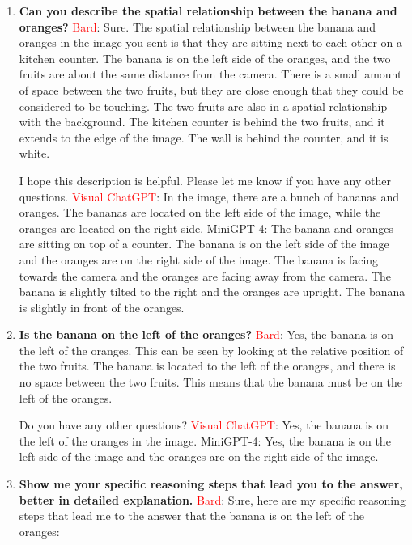     \begin{enumerate}
        \item \textbf{Can you describe the spatial relationship between the banana and oranges?}
        \subitem 
        \textcolor{Red}{Bard}: Sure. The spatial relationship between the banana and oranges in the image you sent is that they are sitting next to each other on a kitchen counter. The banana is on the left side of the oranges, and the two fruits are about the same distance from the camera. There is a small amount of space between the two fruits, but they are close enough that they could be considered to be touching.
        The two fruits are also in a spatial relationship with the background. The kitchen counter is behind the two fruits, and it extends to the edge of the image. The wall is behind the counter, and it is white.

        I hope this description is helpful. Please let me know if you have any other questions.
        \subitem \textcolor{red}{Visual ChatGPT}: In the image, there are a bunch of bananas and oranges. The bananas are located on the left side of the image, while the oranges are located on the right side.
        \subitem MiniGPT-4: The banana and oranges are sitting on top of a counter. The banana is on the left side of the image and the oranges are on the right side of the image. The banana is facing towards the camera and the oranges are facing away from the camera. The banana is slightly tilted to the right and the oranges are upright. The banana is slightly in front of the oranges.
        \item \textbf{Is the banana on the left of the oranges?}
        \subitem \textcolor{Red}{Bard}:
        Yes, the banana is on the left of the oranges. This can be seen by looking at the relative position of the two fruits. The banana is located to the left of the oranges, and there is no space between the two fruits. This means that the banana must be on the left of the oranges.
        
        Do you have any other questions?
        \subitem \textcolor{red}{Visual ChatGPT}: Yes, the banana is on the left of the oranges in the image.
        \subitem MiniGPT-4: Yes, the banana is on the left side of the image and the oranges are on the right side of the image.
        \item \textbf{Show me your specific reasoning steps that lead you to the answer, better in detailed explanation.}
        \subitem \textcolor{Red}{Bard}: Sure, here are my specific reasoning steps that lead me to the answer that the banana is on the left of the oranges:


\end{enumerate}
